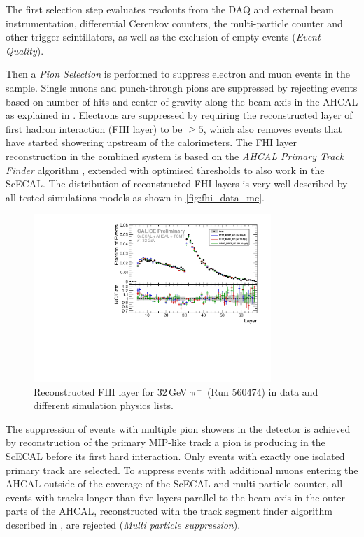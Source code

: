 \documentclass[twoside,a4paper,12pt]{article}
\newcommand\piminus{\(\mathrm{\pi^-}\)}
\begin{document}
The first selection step evaluates readouts from the DAQ and external beam instrumentation, differential Cerenkov counters, the multi-particle counter and other trigger scintillators, as well as the exclusion of empty events (\emph{Event Quality}).

Then a \emph{Pion Selection} is performed to suppress electron and muon events in the sample. Single muons and punch-through pions are suppressed by rejecting events based on number of hits and center of gravity along the beam axis in the AHCAL as explained in \cite{Feege,Guenter}. Electrons are suppressed by requiring the reconstructed layer of first hadron interaction (FHI layer) to be $\geq5$, which also removes events that have started showering upstream of the calorimeters. The FHI layer reconstruction in the combined system is based on the \emph{AHCAL Primary Track Finder} algorithm \cite{MarinaFHI}, extended with optimised thresholds to also work in the ScECAL. The distribution of reconstructed FHI layers is very well described by all tested simulations models as shown in \autoref{fig:fhi_data_mc}.

\begin{figure}[htbp]
\begin{center}
\includegraphics[width=0.8\textwidth]{fig/pion/selection/out_profileFHIlayer_560474.pdf}
\caption{Reconstructed FHI layer for 32\,GeV \piminus\ (Run 560474) in data and different simulation physics lists.}
\label{fig:fhi_data_mc}
\end{center}
\end{figure}

The suppression of events with multiple pion showers in the detector is achieved by reconstruction of the primary MIP-like track a pion is producing in the ScECAL before its first hard interaction. 
Only events with exactly one isolated primary track are selected. To suppress events with additional muons entering the AHCAL outside of the coverage of the ScECAL and multi particle counter, all events with tracks longer than five layers parallel to the beam axis in the outer parts of the AHCAL, reconstructed with the track segment finder algorithm described in \cite{TrackSegments}, are rejected (\emph{Multi particle suppression}).
\end{document}
